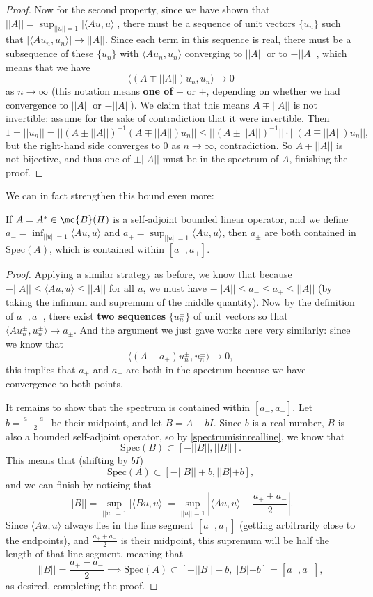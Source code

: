 \begin{proof}
Now for the second property, since we have shown that $||A|| = \sup_{||u|| = 1} |\langle Au, u \rangle|$, there must be a sequence of unit vectors $\{u_n\}$ such that $|\langle Au_n, u_n \rangle| \to ||A||$. Since each term in this sequence is real, there must be a subsequence of these $\{u_n\}$ with $\langle Au_n, u_n\rangle$ converging to $||A||$ or to $-||A||$, which means that we have 
\[
    \langle (A \mp ||A||)u_n, u_n \rangle \to 0
\]  
as $n \to \infty$ (this notation means \textbf{one of} $-$ or $+$, depending on whether we had convergence to $||A||$ or $-||A||$). We claim that this means $A \mp ||A||$ is not invertible: assume for the sake of contradiction that it were invertible. Then
\[
    1 = ||u_n|| = ||(A \pm ||A||)^{-1} (A \mp ||A||) u_n|| \le ||(A \pm ||A||)^{-1}|| \cdot ||(A \mp ||A||) u_n||,
\]
but the right-hand side converges to $0$ as $n \to \infty$, contradiction. So $A \mp ||A||$ is not bijective, and thus one of $\pm ||A||$ must be in the spectrum of $A$, finishing the proof. 
\end{proof}

We can in fact strengthen this bound even more:

\begin{theorem}
If $A = A^\ast \in \mc{B}(H)$ is a self-adjoint bounded linear operator, and we define $a_- = \inf_{||u|| = 1} \langle Au, u \rangle$ and $a_+ = \sup_{||u|| = 1} \langle Au, u \rangle$, then $a_{\pm}$ are both contained in $\text{Spec}(A)$, which is contained within $[a_-, a_+]$. 
\end{theorem}
\begin{proof}
Applying a similar strategy as before, we know that because $-||A|| \le \langle Au, u \rangle \le ||A||$ for all $u$, we must have $-||A|| \le a_- \le a_+ \le ||A||$ (by taking the infimum and supremum of the middle quantity). Now by the definition of $a_-, a_+$, there exist \textbf{two sequences} $\{u_n^{\pm}\}$ of unit vectors so that $\langle Au_n^{\pm}, u_n^{\pm} \rangle \to a_{\pm}$. And the argument we just gave works here very similarly: since we know that
\[
    \langle (A - a_{\pm}) u_n^{\pm}, u_n^{\pm} \rangle \to 0,
\]
this implies that $a_+$ and $a_-$ are both in the spectrum because we have convergence to both points. 

It remains to show that the spectrum is contained within $[a_-, a_+]$. Let $b = \frac{a_- + a_+}{2}$ be their midpoint, and let $B = A - bI$. Since $b$ is a real number, $B$ is also a bounded self-adjoint operator, so by \cref{spectrumisinrealline}, we know that
\[
    \text{Spec}(B) \subset [-||B||, ||B||].
\]
This means that (shifting by $bI$)
\[
    \text{Spec}(A) \subset[-||B|| + b, ||B| + b],
\]
and we can finish by noticing that
\[
    ||B|| = \sup_{||u|| = 1} |\langle Bu, u \rangle| = \sup_{||u|| = 1} \left|\langle Au, u \rangle - \frac{a_+ + a_-}{2}\right|.
\]
Since $\langle Au, u \rangle$ always lies in the line segment $[a_-, a_+]$ (getting arbitrarily close to the endpoints), and $\frac{a_+ + a_-}{2}$ is their midpoint, this supremum will be half the length of that line segment, meaning that
\[
    ||B|| = \frac{a_+ - a_-}{2} \implies \text{Spec}(A) \subset[-||B|| + b, ||B| + b] = [a_-, a_+],
\]  
as desired, completing the proof.
\end{proof}

